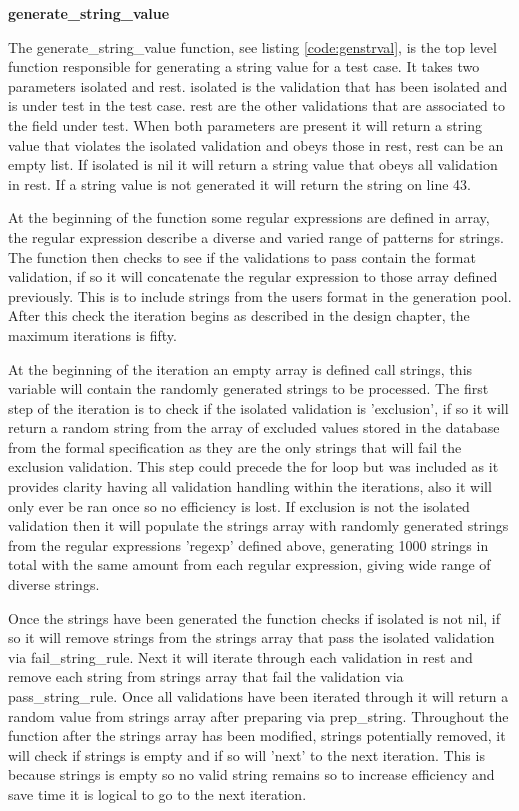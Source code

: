 \documentclass[a4paper,12pt]{article}
\begin{document}
\par \textbf{generate\_string\_value}
\par The generate\_string\_value function, see listing \ref{code:genstrval}, is the top level function responsible for generating a string value for a test case. It takes two parameters isolated and rest. isolated is the validation that has been isolated and is under test in the test case. rest are the other validations that are associated to the field under test. When both parameters are present it will return a string value that violates the isolated validation and obeys those in rest, rest can be an empty list. If isolated is nil it will return a string value that obeys all validation in rest. If a string value is not generated it will return the string on line 43. 
\vspace{3mm}
\par At the beginning of the function some regular expressions are defined in array, the regular expression describe a diverse and varied range of patterns for strings. The function then checks to see if the validations to pass contain the format validation, if so it will concatenate the regular expression to those array defined previously. This is to include strings from the users format in the generation pool. After this check the iteration begins as described in the design chapter, the maximum iterations is fifty.
\vspace{3mm}
\par At the beginning of the iteration an empty array is defined call strings, this variable will contain the randomly generated strings to be processed. The first step of the iteration is to check if the isolated validation is 'exclusion', if so it will return a random string from the array of excluded values stored in the database from the formal specification as they are the only strings that will fail the exclusion validation. This step could precede the for loop but was included as it provides clarity having all validation handling within the iterations, also it will only ever be ran once so no efficiency is lost. If exclusion is not the isolated validation then it will populate the strings array with randomly generated strings from the regular expressions 'regexp' defined above, generating 1000 strings in total with the same amount from each regular expression, giving wide range of diverse strings.
\vspace{3mm}
\par Once the strings have been generated the function checks if isolated is not nil, if so it will remove strings from the strings array that pass the isolated validation via fail\_string\_rule. Next it will iterate through each validation in rest and remove each string from strings array that fail the validation via pass\_string\_rule. Once all validations have been iterated through it will return a random value from strings array after preparing via prep\_string. Throughout the function after the strings array has been modified, strings potentially removed, it will check if strings is empty and if so will 'next' to the next iteration. This is because strings is empty so no valid string remains so to increase efficiency and save time it is logical to go to the next iteration.
\end{document}
